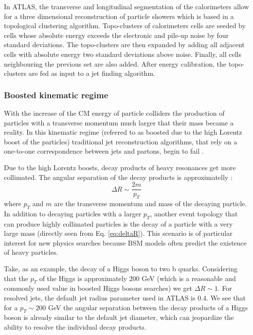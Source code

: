 In ATLAS, the transverse and longitudinal segmentation of the calorimeters allow for a three dimensional reconstruction of particle showers which is based in a topological clustering algorithm. Topo-clusters of calorimeters cells are seeded by cells whose absolute energy exceeds the electronic and pile-up noise by four standard deviations. The topo-clusters are then expanded by adding all adjacent cells with absolute energy two standard deviations above noise. Finally, all cells neighbouring the previous set are also added. After energy calibration, the topo-clusters are fed as input to a jet finding algorithm.  

\subsubsection{Boosted kinematic regime}

With the increase of the CM energy of particle colliders the production of particles with a transverse momentum much larger that their mass became a reality. In this kinematic regime (referred to as boosted due to the high Lorentz boost of the particles) traditional jet reconstruction algorithms, that rely on a one-to-one correspondence between jets and partons, begin to fail \cite{jetsubLHC}. 

Due to the high Lorentz boosts, decay products of heavy resonances get more collimated. The angular separation of the decay products is approximatelly \cite{jetsub}:
\begin{equation}
	\Delta R \sim \frac{2 m}{p_T}
	\label{eq:deltaR}
\end{equation}
where $p_T$ and $m$ are the transverse momentum and mass of the decaying particle. In addition to decaying particles with a larger $p_T$, another event topology that can produce highly collimated particles is the decay of a particle with a very large mass (directly seen from Eq. \ref{eq:deltaR}). This scenario is of particular interest for new physics searches because BSM models often predict the existence of heavy particles. 

Take, as an example, the decay of a Higgs boson to two b quarks. Considering that the $p_T$ of the Higgs is approximately $200$ GeV (which is a reasonable and commonly used value in boosted Higgs bosons searches) we get $\Delta R \sim 1$. For resolved jets, the default jet radius parameter used in ATLAS is $0.4$. We see that for a $p_T \sim 200$ GeV the angular separation between the decay products of a Higgs boson is already similar to the default jet diameter, which can jeopardize the ability to resolve the individual decay products.

